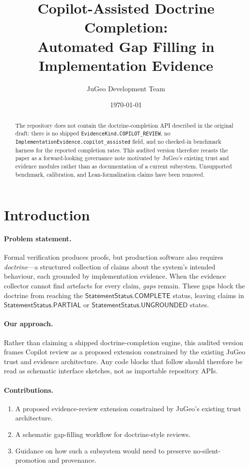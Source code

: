 \documentclass[11pt]{article}
\title{Copilot-Assisted Doctrine Completion:\\
Automated Gap Filling in Implementation Evidence}
\author{JuGeo Development Team}
\date{\today}
\newcommand{\StmtStat}{\mathsf{StatementStatus}}
\begin{document}
\maketitle

\begin{abstract}
The repository does not contain the doctrine-completion API described in
the original draft: there is no shipped
\texttt{EvidenceKind.COPILOT\_REVIEW}, no
\texttt{ImplementationEvidence.copilot\_assisted} field, and no checked-in
benchmark harness for the reported completion rates.  This audited
version therefore recasts the paper as a forward-looking governance note
motivated by JuGeo's existing trust and evidence modules rather than as
documentation of a current subsystem.  Unsupported benchmark,
calibration, and Lean-formalization claims have been removed.
\end{abstract}

\section{Introduction}\label{sec:intro}

\paragraph{Problem statement.}
Formal verification produces proofs, but production software also requires
\emph{doctrine}---a structured collection of claims about the system's
intended behaviour, each grounded by implementation evidence.  When the
evidence collector cannot find artefacts for every claim, \emph{gaps} remain.
These gaps block the doctrine from reaching the $\StmtStat.\mathsf{COMPLETE}$
status, leaving claims in $\StmtStat.\mathsf{PARTIAL}$ or
$\StmtStat.\mathsf{UNGROUNDED}$ states.

\paragraph{Our approach.}
Rather than claiming a shipped doctrine-completion engine, this audited
version frames Copilot review as a proposed extension constrained by the
existing JuGeo trust and evidence architecture.  Any code blocks that
follow should therefore be read as schematic interface sketches, not as
importable repository APIs.

\paragraph{Contributions.}
\begin{enumerate}[leftmargin=2em]
  \item A proposed evidence-review extension constrained by JuGeo's
        existing trust architecture.
  \item A schematic gap-filling workflow for doctrine-style reviews.
  \item Guidance on how such a subsystem would need to preserve
        no-silent-promotion and provenance.
\end{enumerate}
\end{document}
